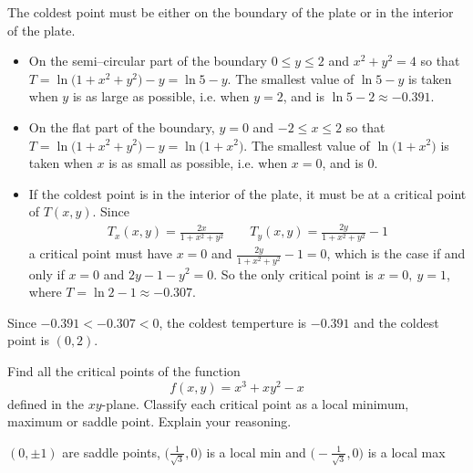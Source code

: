 \begin{solution}
The coldest point must be either on the boundary of the plate
or in the interior of the plate. 
\begin{itemize}
\item 
On the semi--circular part of the boundary $0\le y\le 2$ and
$x^2+y^2=4$ so that $T=\ln\big(1+x^2+y^2\big)-y=\ln 5-y$. The smallest
value of $\ln 5-y$ is taken when $y$ is as large as possible, 
i.e. when $y=2$, and is $\ln 5 -2\approx -0.391$.

\item 
On the flat part of the boundary, $y=0$ and
$-2\le x\le 2$ so that $T=\ln\big(1+x^2+y^2\big)-y=\ln\big(1+x^2\big)$. 
The smallest value of $\ln\big(1+x^2\big)$ is taken when $x$ is as small as possible, i.e. when $x=0$, and is $0$.

\item 
If the coldest point is in the interior of the plate,
it must be at a critical point of $T(x,y)$. Since
\begin{align*}
T_x(x,y)=\frac{2x}{1+x^2+y^2}\qquad 
T_y(x,y)=\frac{2y}{1+x^2+y^2}-1
\end{align*}
a critical point must have $x=0$ and $\frac{2y}{1+x^2+y^2}-1=0$,
which is the case if and only if $x=0$ and $2y-1-y^2=0$. So the only 
critical point is $x=0,\ y=1$, where $T=\ln 2-1\approx -0.307$.
\end{itemize}
Since $-0.391<-0.307<0$, the coldest temperture is $-0.391$ and the
coldest point is $(0,2)$.
\end{solution}

\begin{question}[M200 2001D] %
Find all the critical points of the function 
\begin{equation*}
f(x,y)=x^3+xy^2-x
\end{equation*}
defined in the $xy$-plane. Classify each critical point as a local minimum,
 maximum or saddle point. Explain your reasoning.
\end{question}

%

\begin{answer}
$(0,\pm 1)$ are saddle points,
$\big(\frac{1}{\sqrt{3}},0\big)$ is a local min and
$\big(-\frac{1}{\sqrt{3}},0\big)$ is a local max
\end{answer}

